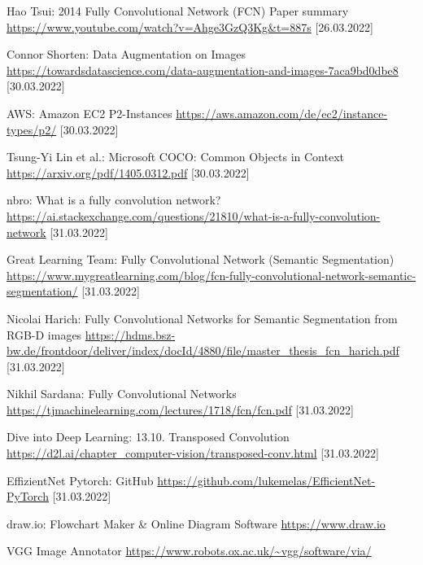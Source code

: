 \documentclass[10pt]{report}
\begin{document}
\begin{thebibliography}{}
 Hao Tsui: 2014 Fully Convolutional Network (FCN) Paper summary \url{https://www.youtube.com/watch?v=Ahge3GzQ3Kg&t=887s} [26.03.2022]

 Connor Shorten: Data Augmentation on Images \url{https://towardsdatascience.com/data-augmentation-and-images-7aca9bd0dbe8} [30.03.2022]

 AWS: Amazon EC2 P2-Instances \url{https://aws.amazon.com/de/ec2/instance-types/p2/}  [30.03.2022]

 Tsung-Yi Lin et al.: Microsoft COCO: Common Objects in Context \url{https://arxiv.org/pdf/1405.0312.pdf}  [30.03.2022]


 nbro: What is a fully convolution network? \url{https://ai.stackexchange.com/questions/21810/what-is-a-fully-convolution-network}  [31.03.2022]

 Great Learning Team: Fully Convolutional Network (Semantic Segmentation) \url{https://www.mygreatlearning.com/blog/fcn-fully-convolutional-network-semantic-segmentation/}  [31.03.2022]

 Nicolai Harich: Fully Convolutional Networks for
Semantic Segmentation
from RGB-D images \url{https://hdms.bsz-bw.de/frontdoor/deliver/index/docId/4880/file/master_thesis_fcn_harich.pdf}  [31.03.2022]

 Nikhil Sardana: Fully Convolutional Networks \url{https://tjmachinelearning.com/lectures/1718/fcn/fcn.pdf}  [31.03.2022]

 Dive into Deep Learning: 13.10. Transposed Convolution \url{https://d2l.ai/chapter_computer-vision/transposed-conv.html}  [31.03.2022]

 EffizientNet Pytorch: GitHub \url{https://github.com/lukemelas/EfficientNet-PyTorch} [31.03.2022]

 draw.io:  Flowchart Maker \& Online Diagram Software \url{https://www.draw.io}

 VGG Image Annotator \url{https://www.robots.ox.ac.uk/\~vgg/software/via/}

\end{thebibliography}

\appendix

\end{document}
